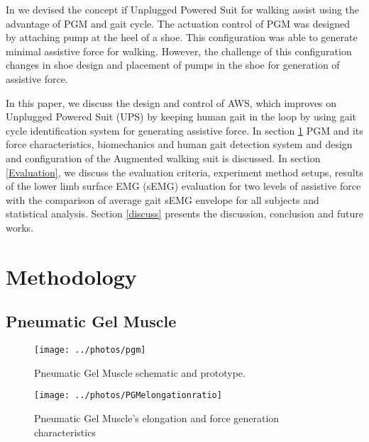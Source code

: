 \documentclass[letterpaper, 10 pt, conference]{ieeeconf}  %
\begin{document}
In \cite{9} we devised the concept if Unplugged Powered Suit for walking assist using the advantage of PGM and gait cycle. The actuation control of PGM was designed by attaching pump at the heel of a shoe. This configuration was able to generate minimal assistive force for walking. However, the challenge of this configuration changes in shoe design and placement of pumps in the shoe for generation of assistive force. 

In this paper, we discuss the design and control of AWS, which improves on Unplugged Powered Suit (UPS) by keeping human gait in the loop by using gait cycle identification system for generating assistive force. In section \ref{methodology} PGM and its force characteristics, biomechanics and human gait detection system and design and configuration of the Augmented walking suit is discussed. In section \ref{Evaluation}, we discuss the evaluation criteria, experiment method setups, results of the lower limb surface EMG (sEMG) evaluation for two levels of assistive force with the comparison of average gait sEMG envelope for all subjects and statistical analysis. Section \ref{discuss} presents the discussion, conclusion and future works.


\section{Methodology} \label{methodology}

\subsection{Pneumatic Gel Muscle} \label{pgm}
\begin{figure}
	\centering
	\texttt{[image: ../photos/pgm]}
	\caption{Pneumatic Gel Muscle schematic and prototype.}
	\label{fig:pgm}
\end{figure}
\begin{figure}
	\centering
	\texttt{[image: ../photos/PGMelongationratio]}
	\caption{Pneumatic Gel Muscle's elongation and force generation characteristics \cite{7}}
	\label{fig:pgmelongationratio}
\end{figure}
\end{document}
